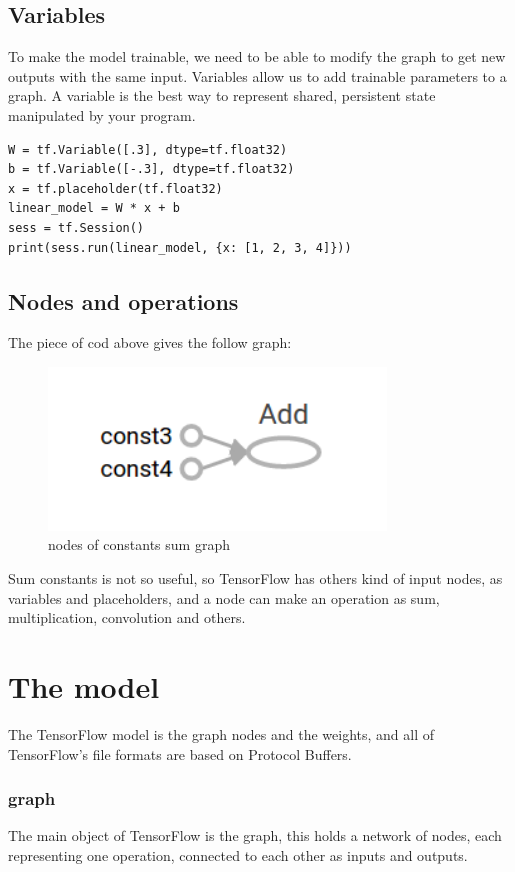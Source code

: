 \documentclass[11pt,openany]{book}
\begin{document}
\section{Variables}

To make the model trainable, we need to be able to modify the graph to get new outputs with the same input. Variables allow us to add trainable parameters to a graph.
A variable is the best way to represent shared, persistent state manipulated by your program.

\begin{verbatim}
W = tf.Variable([.3], dtype=tf.float32)
b = tf.Variable([-.3], dtype=tf.float32)
x = tf.placeholder(tf.float32)
linear_model = W * x + b
sess = tf.Session()
print(sess.run(linear_model, {x: [1, 2, 3, 4]}))
\end{verbatim}

\section{Nodes and operations}
The piece of cod above gives the follow graph:

\begin{figure}[h]
    \centering
    \includegraphics[width=0.8\textwidth]{img/const_add.png}
    \caption{nodes of constants sum graph}
    \label{fig:const_add}
\end{figure}

Sum constants is not so useful, so TensorFlow has others kind of input nodes, as variables and placeholders, and a node can make an operation as sum, multiplication, convolution and others.

\chapter{The model}

The TensorFlow model is the graph nodes and the weights, and all of TensorFlow's file formats are based on Protocol Buffers.

\subsection{graph}
The main object of TensorFlow is the graph, this holds a network of nodes, each representing one operation, connected to each other as inputs and outputs.
\end{document}
